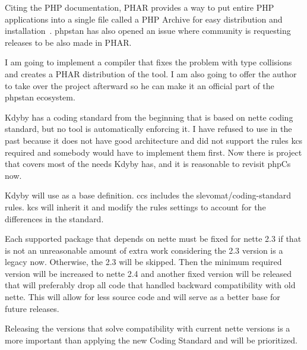Citing the PHP documentation, PHAR provides a way to put entire PHP applications into a single file called a PHP Archive for easy distribution and installation~\cite{php:phar}. \gls{phpstan} has also opened an issue  where community is requesting releases to be also made in PHAR.

I am going to implement a compiler that fixes the problem with type collisions and creates a PHAR distribution of the tool. I am also going to offer the author to take over the project afterward so he can make it an official part of the \gls{phpstan} ecosystem.


Kdyby has a coding standard from the beginning that is based on \gls{nette} coding standard, but no tool is automatically enforcing it. I have refused to use  in the past because it does not have good architecture and did not support the rules \acrlong{kcs} required and somebody would have to implement them first. Now there is  project that covers most of the needs Kdyby has, and it is reasonable to revisit \gls{phpCs} now.

Kdyby will use  as a base definition. \acrlong{ccs} includes the slevomat/coding-standard rules. \acrlong{kcs} will inherit it and modify the rules settings to account for the differences in the standard.


Each supported package that depends on \gls{nette} must be fixed for \gls{nette} 2.3 if that is not an unreasonable amount of extra work considering the 2.3 version is a legacy now. Otherwise, the 2.3 will be skipped. Then the minimum required version will be increased to \gls{nette} 2.4 and another fixed version will be released that will preferably drop all code that handled backward compatibility with old \gls{nette}. This will allow for less source code and will serve as a better base for future releases.

Releasing the versions that solve compatibility with current \gls{nette} versions is a more important than applying the new Coding Standard and will be prioritized.


